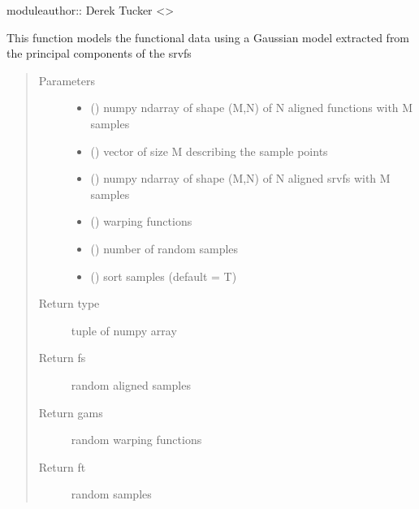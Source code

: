 \documentclass[letterpaper,10pt,english]{sphinxmanual}
\begin{document}
moduleauthor:: Derek Tucker \textless{}\textgreater{}

\begin{fulllineitems}
\label{\detokenize{gauss_model:gauss_model.gauss_model}}
This function models the functional data using a Gaussian model
extracted from the principal components of the srvfs
\begin{quote}\begin{description}
\item[{Parameters}] \leavevmode\begin{itemize}
\item {} 
 () \textendash{} numpy ndarray of shape (M,N) of N aligned functions with
M samples

\item {} 
 () \textendash{} vector of size M describing the sample points

\item {} 
 () \textendash{} numpy ndarray of shape (M,N) of N aligned srvfs with M samples

\item {} 
 () \textendash{} warping functions

\item {} 
 () \textendash{} number of random samples

\item {} 
 () \textendash{} sort samples (default = T)

\end{itemize}

\item[{Return type}] \leavevmode
tuple of numpy array

\item[{Return fs}] \leavevmode
random aligned samples

\item[{Return gams}] \leavevmode
random warping functions

\item[{Return ft}] \leavevmode
random samples

\end{description}\end{quote}

\end{fulllineitems}
\end{document}
